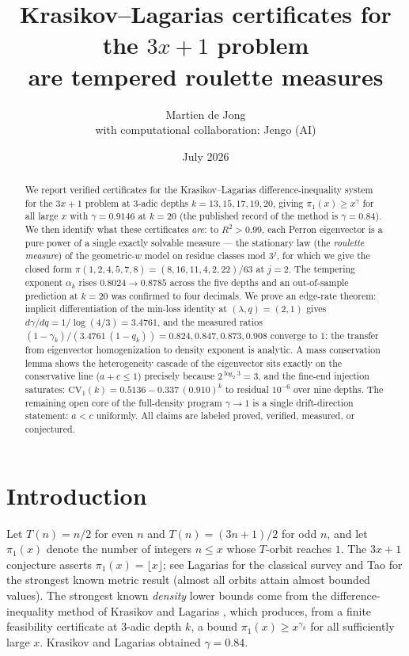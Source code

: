 \documentclass[11pt]{article}
\title{Krasikov--Lagarias certificates for the $3x+1$ problem\\
are tempered roulette measures}
\author{Martien de Jong\\[3pt]
{\normalsize with computational collaboration: Jengo (AI)}}
\date{July 2026}
\theoremstyle{definition}
\theoremstyle{remark}
\newcommand{\CV}{\mathrm{CV}}
\newcommand{\lam}{\lambda}
\newcommand{\gam}{\gamma}
\begin{document}
\maketitle

\begin{abstract}
We report verified certificates for the Krasikov--Lagarias difference-inequality
system for the $3x+1$ problem at $3$-adic depths $k = 13, 15, 17, 19, 20$, giving
$\pi_1(x) \geq x^{\gam}$ for all large $x$ with $\gam = 0.9146$ at $k=20$
(the published record of the method is $\gam = 0.84$). We then identify what these
certificates \emph{are}: to $R^2 > 0.99$, each Perron eigenvector is a pure power
of a single exactly solvable measure --- the stationary law (the \emph{roulette
measure}) of the geometric-$w$ model on residue classes mod $3^j$, for which we
give the closed form $\pi(1,2,4,5,7,8) = (8,16,11,4,2,22)/63$ at $j=2$. The
tempering exponent $\alpha_k$ rises $0.8024 \to 0.8785$ across the five depths and
an out-of-sample prediction at $k=20$ was confirmed to four decimals. We prove an
edge-rate theorem: implicit differentiation of the min-loss identity at
$(\lam,q)=(2,1)$ gives $d\gam/dq = 1/\log(4/3) = 3.4761$, and the measured ratios
$(1-\gam_k)/(3.4761\,(1-q_k)) = 0.824, 0.847, 0.873, 0.908$ converge to $1$: the
transfer from eigenvector homogenization to density exponent is analytic. A mass
conservation lemma shows the heterogeneity cascade of the eigenvector sits exactly
on the conservative line ($a + c \leq 1$) precisely because $2^{\log_2 3} = 3$, and
the fine-end injection saturates: $\CV_1(k) = 0.5136 - 0.337\,(0.910)^k$ to
residual $10^{-6}$ over nine depths. The remaining open core of the full-density
program $\gam \to 1$ is a single drift-direction statement: $a < c$ uniformly. All
claims are labeled proved, verified, measured, or conjectured.
\end{abstract}

\section{Introduction}

Let $T(n) = n/2$ for even $n$ and $T(n) = (3n+1)/2$ for odd $n$, and let
$\pi_1(x)$ denote the number of integers $n \leq x$ whose $T$-orbit reaches $1$.
The $3x+1$ conjecture asserts $\pi_1(x) = \lfloor x \rfloor$; see Lagarias
\cite{Lag85} for the classical survey and Tao \cite{Tao19} for the strongest
known metric result (almost all orbits attain almost bounded values). The
strongest known \emph{density} lower bounds come from the difference-inequality
method of Krasikov and Lagarias \cite{KL03}, which produces, from a finite
feasibility certificate at $3$-adic depth $k$, a bound
$\pi_1(x) \geq x^{\gam_k}$ for all sufficiently large $x$. Krasikov and Lagarias
obtained $\gam = 0.84$.
\end{document}
